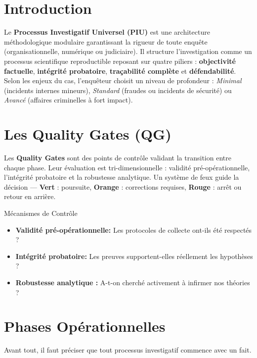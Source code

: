 

\section{Introduction}

Le \textbf{Processus Investigatif Universel (PIU)} est une architecture méthodologique modulaire garantissant la rigueur de toute enquête (organisationnelle, numérique ou judiciaire). Il structure l'investigation comme un processus scientifique reproductible reposant sur quatre piliers : \textbf{objectivité factuelle}, \textbf{intégrité probatoire}, \textbf{traçabilité complète} et \textbf{défendabilité}. Selon les enjeux du cas, l'enquêteur choisit un niveau de profondeur : \textit{Minimal} (incidents internes mineurs), \textit{Standard} (fraudes ou incidents de sécurité) ou \textit{Avancé} (affaires criminelles à fort impact).
\section{Les Quality Gates (QG)}

Les \textbf{Quality Gates} sont des points de contrôle validant la transition entre chaque phase. Leur évaluation est tri-dimensionnelle : validité pré-opérationnelle, l'intégrité probatoire et la robustesse analytique. Un système de feux guide la décision — \textbf{Vert} : poursuite, \textbf{Orange} : corrections requises, \textbf{Rouge} : arrêt ou retour en arrière.

\begin{qgbox}{Mécanismes de Contrôle}
    \begin{itemize}
        \item \textbf{Validité pré-opérationnelle:} Les protocoles de collecte ont-ils été respectés ?
        \item \textbf{Intégrité probatoire:} Les preuves supportent-elles réellement les hypothèses ?
        \item \textbf{Robustesse analytique :} A-t-on cherché activement à infirmer nos théories ?
    \end{itemize}
\end{qgbox}

\section{Phases Opérationnelles}
Avant tout, il faut préciser que tout processus investigatif commence avec un fait. 
